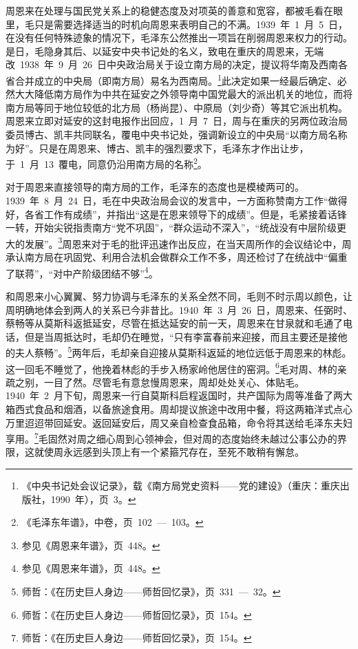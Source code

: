 周恩来在处理与国民党关系上的稳健态度及对项英的善意和宽容，都被毛看在眼里，毛只是需要选择适当的时机向周恩来表明自己的不满。1939~年~1~月~5~日，在没有任何特殊迹象的情况下，毛泽东公然推出一项旨在削弱周恩来权力的行动。是日，毛隐身其后、以延安中央书记处的名义，致电在重庆的周恩来，无端改~1938~年~9~月~26~日中央政治局关于设立南方局的决定，提议将华南及西南各省合并成立的中央局（即南方局）易名为西南局。\footnote{《中央书记处会议记录》，载《南方局党史资料——党的建设》（重庆：重庆出版社，1990~年），页~3。}此决定如果一经最后确定、必然大大降低南方局作为中共在延安之外领导南中国党最大的派出机关的地位，而将南方局等同于地位较低的北方局（杨尚昆）、中原局（刘少奇）等其它派出机构。周恩来立即对延安的这封电报作出回应，1~月~7~日，周与在重庆的另两位政治局委员博古、凯丰共同联名，覆电中央书记处，强调新设立的中央局“以南方局名称为好”。只是在周恩来、博古、凯丰的强烈要求下，毛泽东才作出让步，于~1~月~13~覆电，同意仍沿用南方局的名称\footnote{《毛泽东年谱》，中卷，页~102~—~103。}。

对于周恩来直接领导的南方局的工作，毛泽东的态度也是模棱两可的。1939~年~8~月~24~日，毛在中央政治局会议的发言中，一方面称赞南方工作“做得好，各省工作有成绩”，并指出“这是在恩来领导下的成绩”。但是，毛紧接着话锋一转，开始尖锐指责南方“党不巩固”，“群众运动不深入”，“统战没有中层阶级更大的发展”。\footnote{参见《周恩来年谱》，页~448。}周恩来对于毛的批评迅速作出反应，在当天周所作的会议结论中，周承认南方局在巩固党、利用合法机会做群众工作不多，周还检讨了在统战中“偏重了联蒋”，“对中产阶级团结不够”\footnote{参见《周恩来年谱》，页~448。}。

和周恩来小心翼翼、努力协调与毛泽东的关系全然不同，毛则不时示周以颜色，让周明确地体会到两人的关系已今非昔比。1940~年~3~月~26~日，周恩来、任弼时、蔡畅等从莫斯科返抵延安，尽管在抵达延安的前一天，周恩来在甘泉就和毛通了电话，但是当周抵达时，毛却仍在睡觉，“只有李富春前来迎接，而且主要还是接他的夫人蔡畅”。\footnote{师哲：《在历史巨人身边——师哲回忆录》，页~331~—~32。}两年后，毛却亲自迎接从莫斯科返延的地位远低于周恩来的林彪。这一回毛不睡觉了，他挽着林彪的手步入杨家岭他居住的窑洞。\footnote{师哲：《在历史巨人身边——师哲回忆录》，页~154。}毛对周、林的亲疏之别，一目了然。尽管毛有意怠慢周恩来，周却处处关心、体贴毛。1940~年~2~月下旬，周恩来一行自莫斯科启程返国时，共产国际为周等准备了两大箱西式食品和烟酒，以备旅途食用。周却提议旅途中改用中餐，将这两箱洋式点心万里迢迢带回延安。返回延安后，周又亲自检查食品箱，命令将其送给毛泽东夫妇享用。\footnote{师哲：《在历史巨人身边——师哲回忆录》，页~154。}毛固然对周之细心周到心领神会，但对周的态度始终未越过公事公办的界限，这就使周永远感到头顶上有一个紧箍咒存在，至死不敢稍有懈怠。

